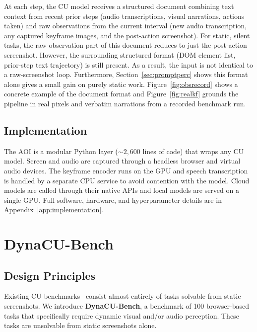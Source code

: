 \documentclass[11pt]{article}
\begin{document}
At each step, the CU model receives a structured document combining text context from recent prior steps (audio transcriptions, visual narrations, actions taken) and raw observations from the current interval (new audio transcription, any captured keyframe images, and the post-action screenshot).
For static, silent tasks, the raw-observation part of this document reduces to just the post-action screenshot. However, the surrounding structured format (DOM element list, prior-step text trajectory) is still present. As a result, the input is not identical to a raw-screenshot loop. Furthermore, Section~\ref{sec:promptperc} shows this format alone gives a small gain on purely static work.
Figure~\ref{fig:obsrecord} shows a concrete example of the document format and Figure~\ref{fig:realkf} grounds the pipeline in real pixels and verbatim narrations from a recorded benchmark run.

\subsection{Implementation}
\label{sec:implementation}

The AOI is a modular Python layer (${\sim}2{,}600$ lines of code) that wraps any CU model.
Screen and audio are captured through a headless browser and virtual audio
devices. The keyframe encoder runs on the GPU and speech transcription is handled by a separate
CPU service to avoid contention with the model.
Cloud models are called through their native APIs and local models are served on a
single GPU.
Full software, hardware, and hyperparameter details are in
Appendix~\ref{app:implementation}.

\section{DynaCU-Bench}
\label{sec:benchmark}

\subsection{Design Principles}

Existing CU benchmarks~\citep{osworld,webarena,webvoyager} consist almost entirely of tasks solvable from static screenshots.
We introduce \textbf{DynaCU-Bench}, a benchmark of 100 browser-based tasks that specifically require dynamic visual and/or audio perception. These tasks are unsolvable from static screenshots alone.
\end{document}
